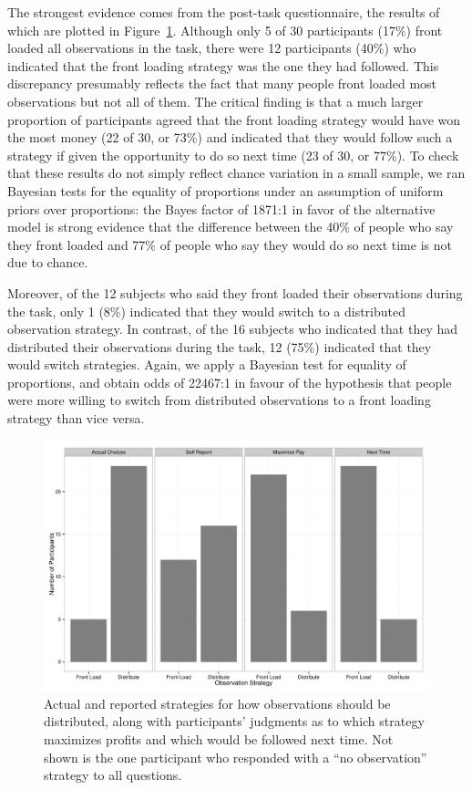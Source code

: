 \documentclass[authoryear]{elsarticle}
\begin{document}
The strongest evidence comes from the post-task questionnaire, the results of which are plotted in Figure~\ref{fig:realLifeChoices2}. Although only 5 of 30 participants (17\%) front loaded all observations in the task, there were 12 participants (40\%) who indicated that the front loading strategy was the one they had followed. This discrepancy presumably reflects the fact that many people front loaded most observations but not all of them. The critical finding is that a much larger proportion of participants agreed that the front loading strategy would have won the most money (22 of 30, or 73\%) and indicated that they would follow such a strategy if given the opportunity to do so next time (23 of 30, or 77\%). To check that these results do not simply reflect chance variation in a small sample, we ran Bayesian tests for the equality of proportions under an assumption of uniform priors over proportions: the Bayes factor of 1871:1 in favor of the alternative model is strong evidence that the difference between the 40\% of people who say they front loaded and 77\% of people who say they would do so next time is not due to chance.

Moreover, of the 12 subjects who said they front loaded their observations during the task, only 1 (8\%) indicated that they would switch to a distributed observation strategy. In contrast, of the 16 subjects who indicated that they had distributed their observations during the task, 12 (75\%) indicated that they would switch strategies. Again, we apply a Bayesian test for equality of proportions, and obtain odds of 22467:1 in favour of the hypothesis that people were more willing to switch from distributed observations to a front loading strategy than vice versa.


\begin{figure}[t]
\begin{center}
\includegraphics[scale=.5]{RLstrategy.pdf}
\caption{Actual and reported strategies for how observations should be distributed, along with participants' judgments as to which strategy maximizes profits and which would be followed next time. Not shown is the one participant who responded with a ``no observation'' strategy to all questions.}
\label{fig:realLifeChoices2}
\end{center}
\end{figure}
\end{document}
